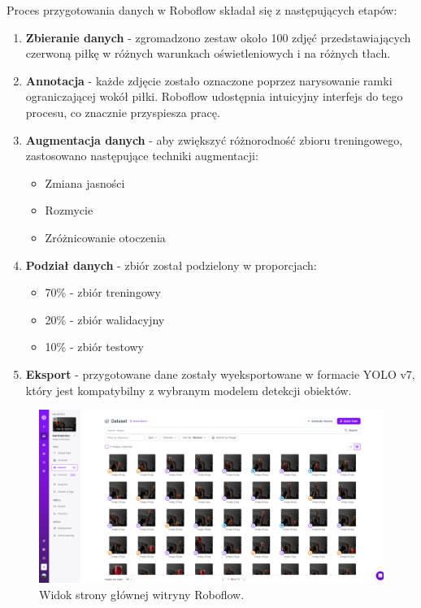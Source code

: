 \documentclass[a4paper,twoside,12pt]{book}
\begin{document}
Proces przygotowania danych w Roboflow składał się z następujących etapów:

\begin{enumerate}
	\item \textbf{Zbieranie danych} - zgromadzono zestaw około 100 zdjęć przedstawiających czerwoną piłkę w różnych warunkach oświetleniowych i na różnych tłach.
	
	\item \textbf{Annotacja} - każde zdjęcie zostało oznaczone poprzez narysowanie ramki ograniczającej wokół piłki. Roboflow udostępnia intuicyjny interfejs do tego procesu, co znacznie przyspiesza pracę.
	
	\item \textbf{Augmentacja danych} - aby zwiększyć różnorodność zbioru treningowego, zastosowano następujące techniki augmentacji:
	\begin{itemize}
		\item Zmiana jasności 
		\item Rozmycie
		\item Zróżnicowanie otoczenia
	\end{itemize}
	
	\item \textbf{Podział danych} - zbiór został podzielony w proporcjach:
	\begin{itemize}
		\item 70\% - zbiór treningowy
		\item 20\% - zbiór walidacyjny
		\item 10\% - zbiór testowy
	\end{itemize}
	
	\item \textbf{Eksport} - przygotowane dane zostały wyeksportowane w formacie YOLO v7, który jest kompatybilny z wybranym modelem detekcji obiektów.
\end{enumerate}

\begin{figure}[h]
	\centering
	\includegraphics[width=1\textwidth]{Images/Roboflow/mainscreen.png}
	\caption{Widok strony głównej witryny Roboflow.}
	\label{fig:roboflow-main}
\end{figure}
\end{document}
